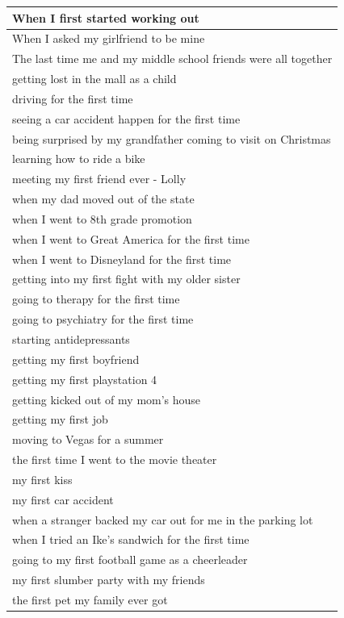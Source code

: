 \documentclass[
  .7em,
  letterpaper,
  DIV=11,
  numbers=noendperiod]{scrartcl}
\begin{document}
\begin{table}
\begin{tabular}{l}
\hline
When I first started working out\\
\hline
When I asked my girlfriend to be mine\\
\hline
The last time me and my middle school friends were all together\\
\hline
getting lost in the mall as a child\\
\hline
driving for the first time\\
\hline
seeing a car accident happen for the first time\\
\hline
being surprised by my grandfather coming to visit on Christmas\\
\hline
learning how to ride a bike\\
\hline
meeting my first friend ever - Lolly\\
\hline
when my dad moved out of the state\\
\hline
when I went to 8th grade promotion\\
\hline
when I went to Great America for the first time\\
\hline
when I went to Disneyland for the first time\\
\hline
getting into my first fight with my older sister\\
\hline
going to therapy for the first time\\
\hline
going to psychiatry for the first time\\
\hline
starting antidepressants\\
\hline
getting my first boyfriend\\
\hline
getting my first playstation 4\\
\hline
getting kicked out of my mom's house\\
\hline
getting my first job\\
\hline
moving to Vegas for a summer\\
\hline
the first time I went to the movie theater\\
\hline
my first kiss\\
\hline
my first car accident\\
\hline
when a stranger backed my car out for me in the parking lot\\
\hline
when I tried an Ike's sandwich for the first time\\
\hline
going to my first football game as a cheerleader\\
\hline
my first slumber party with my friends\\
\hline
the first pet my family ever got\\

\end{tabular}
\end{table}
\end{document}
